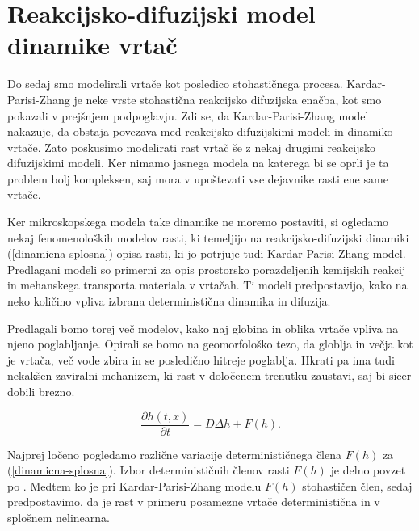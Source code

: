 \documentclass[a4paper, twoside, 12pt]{book}
\begin{document}
\newpage
\section{Reakcijsko-difuzijski model dinamike vrtač}

Do sedaj smo modelirali vrtače kot posledico stohastičnega procesa. Kardar-Parisi-Zhang je neke vrste stohastična reakcijsko difuzijska enačba, kot smo pokazali v prejšnjem podpoglavju. Zdi se, da Kardar-Parisi-Zhang model nakazuje, da obstaja povezava med reakcijsko difuzijskimi modeli in dinamiko vrtače. Zato poskusimo modelirati rast vrtač še z nekaj drugimi reakcijsko difuzijskimi modeli. Ker nimamo jasnega modela na katerega bi se oprli je ta problem bolj kompleksen, saj mora v upoštevati vse dejavnike rasti ene same vrtače. 

Ker mikroskopskega modela take dinamike ne moremo postaviti, si ogledamo nekaj fenomenoloških modelov rasti, ki temeljijo na reakcijsko-difuzijski dinamiki (\ref{dinamicna-splosna}) opisa rasti, ki jo potrjuje tudi Kardar-Parisi-Zhang model. Predlagani modeli so primerni za opis prostorsko porazdeljenih kemijskih reakcij in mehanskega transporta materiala v vrtačah. Ti modeli predpostavijo, kako na neko količino vpliva izbrana deterministična dinamika in difuzija.

Predlagali bomo torej več modelov, kako naj globina in oblika vrtače vpliva na njeno poglabljanje. Opirali se bomo na geomorfološko tezo, da globlja in večja kot je vrtača, več vode zbira in se posledično hitreje poglablja. Hkrati pa ima tudi nekakšen zaviralni mehanizem, ki rast v določenem trenutku zaustavi, saj bi sicer dobili brezno.

\begin{equation}
  \frac{ \partial h(t,x) }{ \partial t} = D \Delta h + F(h).
  \label{dinamicna-splosna}
\end{equation}

Najprej ločeno pogledamo različne variacije determinističnega člena $F(h)$ za (\ref{dinamicna-splosna}). Izbor determinističnih členov rasti $F(h)$ je delno povzet po \cite{kandler2010population}. Medtem ko je pri Kardar-Parisi-Zhang modelu $F(h)$ stohastičen člen, sedaj predpostavimo, da je rast v primeru posamezne vrtače deterministična in v splošnem nelinearna.

\end{document}
